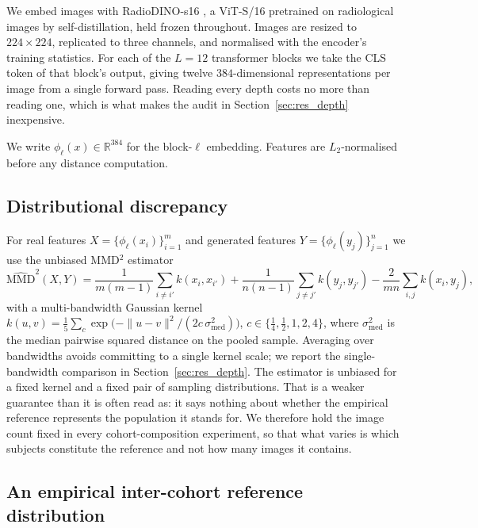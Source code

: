 \documentclass[preprint,12pt,authoryear]{elsarticle}
\newcommand{\mmd}{\mathrm{MMD}}
\begin{document}
We embed images with RadioDINO-s16 \citep{perezrad}, a ViT-S/16
pretrained on radiological images by self-distillation, held frozen throughout.
Images are resized to $224\times224$, replicated to three channels, and
normalised with the encoder's training statistics. For each of the $L=12$
transformer blocks we take the CLS token of that block's output, giving twelve
$384$-dimensional representations per image from a single forward pass. Reading
every depth costs no more than reading one, which is what makes the audit in
Section~\ref{sec:res_depth} inexpensive.

We write $\phi_\ell(x) \in \mathbb{R}^{384}$ for the block-$\ell$ embedding.
Features are $L_2$-normalised before any distance computation.

\subsection{Distributional discrepancy}
\label{sec:mmd}

For real features $X = \{\phi_\ell(x_i)\}_{i=1}^{m}$ and generated features
$Y = \{\phi_\ell(y_j)\}_{j=1}^{n}$ we use the unbiased MMD$^2$ estimator
\citep{gretton2012kernel}
\begin{equation}
\widehat{\mmd}^2(X,Y) =
  \frac{1}{m(m\!-\!1)}\!\sum_{i \neq i'}\! k(x_i,x_{i'})
+ \frac{1}{n(n\!-\!1)}\!\sum_{j \neq j'}\! k(y_j,y_{j'})
- \frac{2}{mn}\sum_{i,j} k(x_i,y_j),
\label{eq:mmd}
\end{equation}
with a multi-bandwidth Gaussian kernel
$k(u,v) = \frac{1}{5}\sum_{c} \exp\!\big(-\|u-v\|^2 / (2 c\,\sigma^2_{\mathrm{med}})\big)$,
$c \in \{\tfrac14, \tfrac12, 1, 2, 4\}$, where $\sigma^2_{\mathrm{med}}$ is the
median pairwise squared distance on the pooled sample. Averaging over
bandwidths avoids committing to a single kernel scale; we report the
single-bandwidth comparison in Section~\ref{sec:res_depth}. The estimator is
unbiased for a fixed kernel and a fixed pair of sampling distributions. That
is a weaker guarantee than it is often read as: it says nothing about whether
the empirical reference represents the population it stands for. We therefore
hold the image count fixed in every cohort-composition experiment, so that what
varies is which subjects constitute the reference and not how many images it
contains.

\subsection{An empirical inter-cohort reference distribution}
\label{sec:cohortnull}
\end{document}
